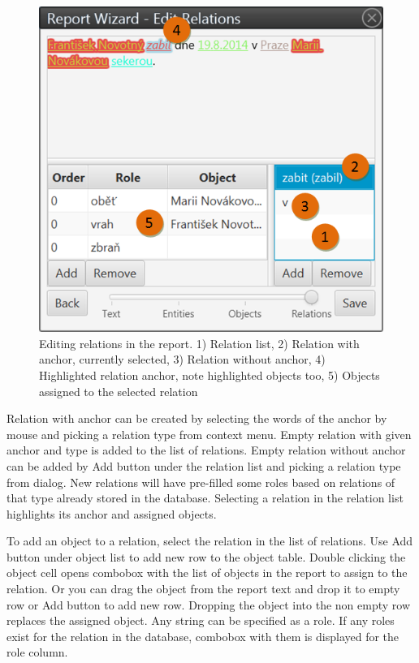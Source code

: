 \begin{figure}[!htb]
        \centering
        \includegraphics[width=\textwidth]{Images/relations}
        \caption{Editing relations in the report. 1) Relation list, 2) Relation
		 with anchor, currently selected, 3) Relation without anchor, 4) Highlighted
		 relation anchor, note highlighted objects too, 5) Objects assigned to
		 the selected relation}
        \label{fig:Relations}
\end{figure}

Relation with anchor can be created by selecting the words of the anchor by
mouse and picking a relation type from context menu. Empty relation with given
anchor and type is added to the list of relations. Empty relation without anchor
can be added by Add button under the relation list and picking a relation type
from dialog. New relations will have pre-filled some roles based on relations of
that type already stored in the database. Selecting a relation in the relation
list highlights its anchor and assigned objects.

To add an object to a relation, select the relation in the list of relations.
Use Add button under object list to add new row to the object table. Double
clicking the object cell opens combobox with the list of objects in the report
to assign to the relation. Or you can drag the object from the report text and
drop it to empty row or Add button to add new row. Dropping the object into the
non empty row replaces the assigned object. Any string can be specified as
a role. If any roles exist for the relation in the database, combobox with
them is displayed for the role column.

